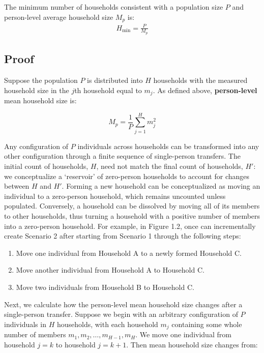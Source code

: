 \documentclass[
]{article}
\providecommand{\tightlist}{%
  \setlength{\itemsep}{0pt}\setlength{\parskip}{0pt}}
\begin{document}
The minimum number of households consistent with a population size \(P\)
and person-level average household size \(M_p\) is: \begin{align}
H_{\min} = \frac{P}{M_p}
\end{align}

\hypertarget{proof}{%
\subsection{Proof}\label{proof}}

Suppose the population \(P\) is distributed into \(H\) households with
the measured household size in the \(j\)th household equal to \(m_j\).
As defined above, \textbf{person-level} mean household size is:

\begin{equation}
M_p = \frac{1}{P}\sum_{j = 1}^H m_j^2
\end{equation}

Any configuration of \(P\) individuals across households can be
transformed into any other configuration through a finite sequence of
single-person transfers. The initial count of households, \(H\), need
not match the final count of households, \(H'\): we conceptualize a
`reservoir' of zero-person households to account for changes between
\(H\) and \(H'\). Forming a new household can be conceptualized as
moving an individual to a zero-person household, which remains uncounted
unless populated. Conversely, a household can be dissolved by moving all
of its members to other households, thus turning a household with a
positive number of members into a zero-person household. For example, in
Figure 1.2, once can incrementally create Scenario 2 after starting from
Scenario 1 through the following steps:

\begin{enumerate}
\def\labelenumi{\arabic{enumi}.}
\tightlist
\item
  Move one individual from Household A to a newly formed Household C.
\item
  Move another individual from Household A to Household C.
\item
  Move two individuals from Household B to Household C.
\end{enumerate}

Next, we calculate how the person-level mean household size changes
after a single-person transfer. Suppose we begin with an arbitrary
configuration of \(P\) individuals in \(H\) households, with each
household \(m_j\) containing some whole number of members
\(m_1, m_2, \ldots, m_{H-1}, m_H\). We move one individual from
household \(j = k\) to household \(j = k+1\). Then mean household size
changes from:
\end{document}
